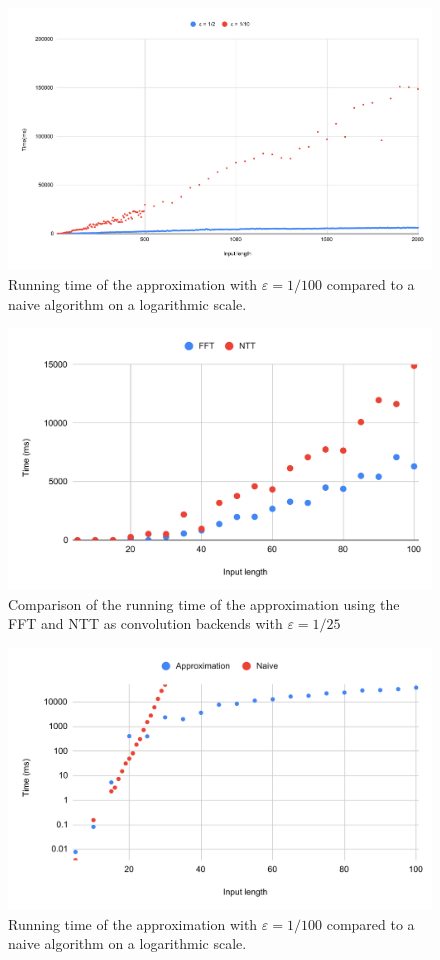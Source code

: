 \begin{figure}[h!]
    \centering
    \includegraphics[width=\linewidth]{charts/input_length.pdf}
    \caption{Running time of the approximation with $\varepsilon = 1/100$ compared to a naive algorithm on a logarithmic scale.}
    \label{fig:chart}
\end{figure}

\begin{figure}[h!]
    \centering
    \includegraphics[width=\linewidth]{charts/fft_ntt.pdf}
    \caption{Comparison of the running time of the approximation using the FFT and NTT as convolution backends with $\varepsilon = 1/25$  }
    \label{fig:chart}
\end{figure}

\begin{figure}[h!]
    \centering
    \includegraphics[width=\linewidth]{charts/naive.pdf}
    \caption{Running time of the approximation with $\varepsilon = 1/100$ compared to a naive algorithm on a logarithmic scale.}
    \label{fig:chart}
\end{figure}



